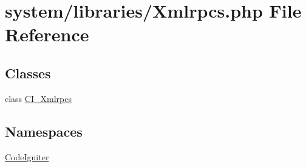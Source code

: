 \hypertarget{_xmlrpcs_8php}{}\section{system/libraries/\+Xmlrpcs.php File Reference}
\label{_xmlrpcs_8php}
\subsection*{Classes}
\begin{DoxyCompactItemize}
\item 
class \mbox{\hyperlink{class_c_i___xmlrpcs}{C\+I\+\_\+\+Xmlrpcs}}
\end{DoxyCompactItemize}
\subsection*{Namespaces}
\begin{DoxyCompactItemize}
\item 
 \mbox{\hyperlink{namespace_code_igniter}{Code\+Igniter}}
\end{DoxyCompactItemize}
